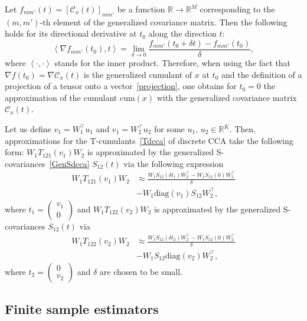 \documentclass{article}
\newcommand{\zero}{0}
\newcommand{\inner}[1]{\left\langle#1\right\rangle}
\newcommand{\diag}{\mathrm{diag}}
\newcommand{\R}{\mathbb{R}}
\newcommand{\cum}{\mathrm{cum}}
\newcommand{\ccal}{\mathcal{C}}
\begin{document}
Let $f_{mm'}(t) = [\ccal_x(t)]_{mm'}$ be a function $\R\to \R^M$ corresponding to the $(m,m')$-th element of the generalized covariance matrix. Then the following holds for its directional derivative at $t_0$ along the direction $t$:
$$
\inner{\nabla f_{mm'}(t_0),t} = \lim_{\delta\to0}\frac{ f_{mm'}(t_0+\delta t) - f_{mm'}(t_0)}{\delta},
$$
where $\inner{\cdot,\cdot}$ stands for the inner product. Therefore, when using the fact that $\nabla f(t_0) = \nabla \ccal_x(t)$ is the generalized cumulant of $x$ at $t_0$ and the definition of a projection of a tensor onto a vector~\eqref{projection}, one obtains for $t_0=\zero$ the approximation of the cumulant $\cum(x)$ with the generalized covariance matrix $\ccal_x(t)$.

Let us define $v_1 = W_1^{\top} u_1$ and $v_1 = W_2^{\top} u_2$ for some $u_1,\,u_2 \in\R^K$. Then, approximations for the T-cumulants~\eqref{Tdcca} of discrete CCA take the following form:
$W_1T_{121}(v_1)W_2$ is approximated by the generalized S-covariances~\eqref{GenSdcca} $S_{12}(t)$ via the following expression
$$
\begin{aligned}
W_1T_{121}(v_1)W_2 & \approx \frac{ W_1 S_{12} (\delta t_1) W_2^{\top} - W_1 S_{12}(\zero) W_2^{\top} }{\delta} \\
& - W_1 \diag(v_1) S_{12} W_2^{\top},
\end{aligned}
$$
where $t_1 = \begin{pmatrix} v_1 \\ 0 \end{pmatrix}$ and $W_1T_{122}(v_2)W_2$ is approximated by the generalized S-covariances $S_{12}(t)$ via
$$
\begin{aligned}
W_1T_{122}(v_2)W_2 & \approx \frac{ W_1 S_{12} (\delta t_2) W_2^{\top} - W_1 S_{12}(\zero) W_2^{\top} }{\delta} 
\\ & - W_1  S_{12} \diag(v_2) W_2^{\top},
\end{aligned}
$$
where $t_2 = \begin{pmatrix} 0 \\ v_2 \end{pmatrix}$ and $\delta$ are chosen to be small.
















\subsection{Finite sample estimators}
\label{app:finite-sample-estimators}
\end{document}
